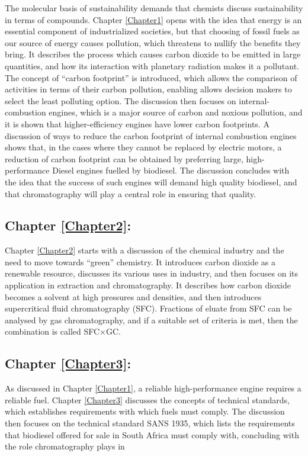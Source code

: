 The molecular basis of sustainability \autocite{Anastas2016} demands that
chemists discuss sustainability in terms of compounds. Chapter \ref{Chapter1}
opens with the idea that energy is an essential component of industrialized
societies, but that choosing of fossil fuels as our source of energy causes
pollution, which threatens to nullify the benefits they bring. It describes the
process which causes carbon dioxide to be emitted in large quantities, and how its
interaction with planetary radiation makes it a pollutant. The concept of
``carbon footprint'' is introduced, which allows the comparison of activities in
terms of their carbon pollution, enabling allows decision makers to select the
least polluting option. The discussion then focuses on internal-combustion
engines, which is a major source of carbon and noxious pollution, and it is
shown that higher-efficiency engines have lower carbon footprints. A discussion
of ways to reduce the carbon footprint of internal combustion engines shows
that, in the cases where they cannot be replaced by electric motors, a reduction
of carbon footprint can be obtained by preferring large, high-performance Diesel
engines fuelled by biodiesel. The discussion concludes with the idea that the
success of such engines will demand high quality biodiesel, and that
chromatography will play a central role in ensuring that quality.

\subsection{Chapter \ref{Chapter2}:  }

Chapter \ref{Chapter2} starts with a discussion of the chemical industry and the
need to move towards ``green'' chemistry. It introduces carbon dioxide as a
renewable resource, discusses its various uses in industry, and then focuses on
its application in extraction and chromatography. It describes how carbon
dioxide becomes a solvent at high pressures and densities, and then introduces
supercritical fluid chromatography (SFC). Fractions of eluate from SFC can be
analysed by gas chromatography, and if a suitable set of criteria is met, then
the combination is called SFC×GC.

\subsection{Chapter \ref{Chapter3}:  }

As discussed in Chapter \ref{Chapter1}, a reliable high-performance engine
requires a reliable fuel. Chapter \ref{Chapter3} discusses the concepts of
technical standards, which establishes requirements with which fuels must
comply. The discussion then focuses on the technical standard SANS 1935, which
lists the requirements that biodiesel offered for sale in South Africa must
comply with, concluding with the role chromatography plays in 

